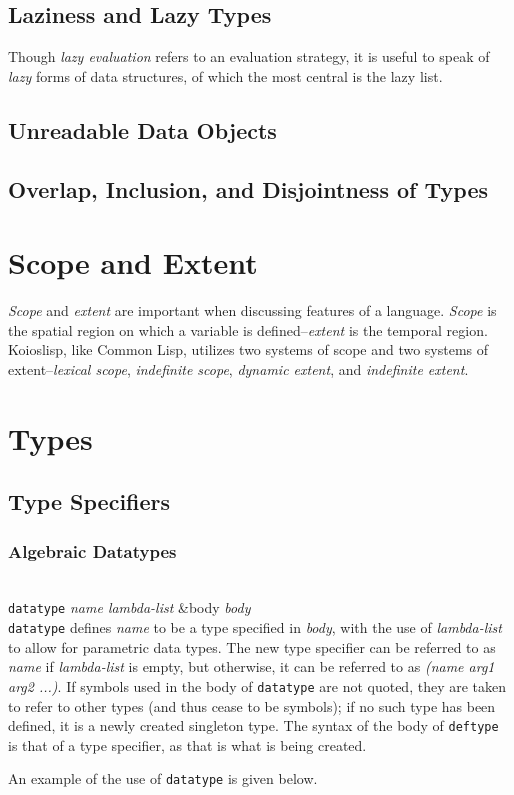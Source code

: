 \documentclass[10pt]{book}
\newenvironment{defother}[2]{[\textit{#1}]\\\texttt{#2}\index{#2}}{\\}
\newenvironment{defmacro}[1]{\begin{defother}{Macro}{#1}}{\end{defother}}
\begin{document}
\section{Laziness and Lazy Types}
Though \textit{lazy evaluation} refers to an evaluation strategy, it is useful to speak of \textit{lazy} forms of data structures, of which the most central is the lazy list. 
\section{Unreadable Data Objects}
\section{Overlap, Inclusion, and Disjointness of Types}
\chapter{Scope and Extent}
\textit{Scope} and \textit{extent} are important when discussing features of a language. \textit{Scope} is the spatial region on which a variable is defined--\textit{extent} is the temporal region. Koioslisp, like Common Lisp, utilizes two systems of scope and two systems of extent--\textit{lexical scope}, \textit{indefinite scope}, \textit{dynamic extent}, and \textit{indefinite extent}.
\chapter{Types}
\section{Type Specifiers}
\subsection{Algebraic Datatypes}
\begin{defmacro}{datatype} \textit{name lambda-list} \&body \textit{body}\\
\texttt{datatype} defines \textit{name} to be a type specified in \textit{body}, with the use of \textit{lambda-list} to allow for parametric data types. The new type specifier can be referred to as \textit{name} if \textit{lambda-list} is empty, but otherwise, it can be referred to as \textit{(name arg1 arg2 ...)}. If symbols used in the body of \texttt{datatype} are not quoted, they are taken to refer to other types (and thus cease to be symbols); if no such type has been defined, it is a newly created singleton type.
The syntax of the body of \texttt{deftype} is that of a type specifier, as that is what is being created.

An example of the use of \texttt{datatype} is given below.
\end{defmacro}
\end{document}
